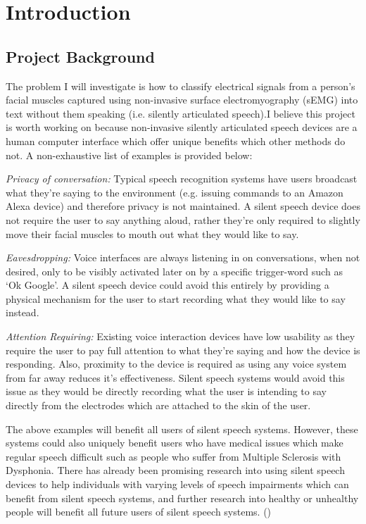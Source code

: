 \chapter{Introduction} \label{chap:intro}

\section{Project Background}

The problem I will investigate is how to classify electrical signals from a person's facial
muscles captured using non-invasive surface electromyography (sEMG) into text without
them speaking (i.e. silently articulated speech).I believe this project is worth working on
because non-invasive silently articulated speech devices are a human computer interface
which offer unique benefits which other methods do not. A non-exhaustive list of examples
is provided below:

\emph{Privacy of conversation:} Typical speech recognition systems have users broadcast
what they're saying to the environment (e.g. issuing commands to an Amazon Alexa
device) and therefore privacy is not maintained. A silent speech device does not require the
user to say anything aloud, rather they're only required to slightly move their facial muscles
to mouth out what they would like to say.

\emph{Eavesdropping:} Voice interfaces are always listening in on conversations, when not
desired, only to be visibly activated later on by a specific trigger-word such as ‘Ok Google'.
A silent speech device could avoid this entirely by providing a physical mechanism for the
user to start recording what they would like to say instead.

\emph{Attention Requiring:} Existing voice interaction devices have low usability as they
require the user to pay full attention to what they're saying and how the device is
responding. Also, proximity to the device is required as using any voice system from far
away reduces it's effectiveness. Silent speech systems would avoid this issue as they
would be directly recording what the user is intending to say directly from the electrodes
which are attached to the skin of the user.

The above examples will benefit all users of silent speech systems. However, these
systems could also uniquely benefit users who have medical issues which make regular
speech difficult such as people who suffer from Multiple Sclerosis with Dysphonia. There
has already been promising research into using silent speech devices to help individuals
with varying levels of speech impairments which can benefit from silent speech systems,
and further research into healthy or unhealthy people will benefit all future users of silent
speech systems.
(\cite{pmlr-v116-kapur20a})